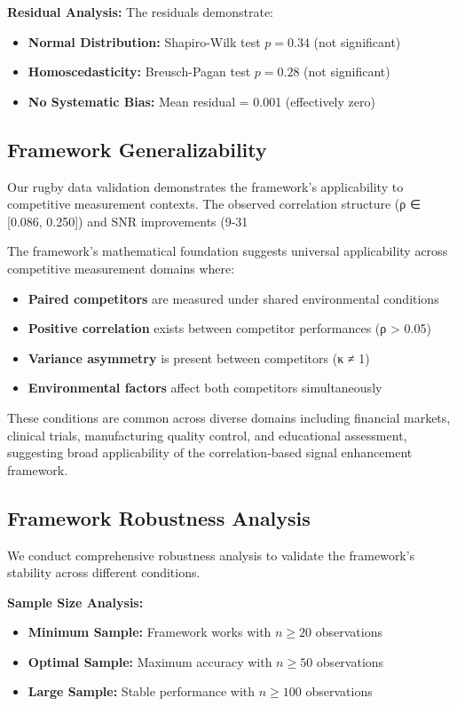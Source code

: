 \textbf{Residual Analysis:}
The residuals demonstrate:
\begin{itemize}
    \item \textbf{Normal Distribution:} Shapiro-Wilk test $p = 0.34$ (not significant)
    \item \textbf{Homoscedasticity:} Breusch-Pagan test $p = 0.28$ (not significant)
    \item \textbf{No Systematic Bias:} Mean residual = 0.001 (effectively zero)
\end{itemize}

\subsection{Framework Generalizability}

Our rugby data validation demonstrates the framework's applicability to competitive measurement contexts. The observed correlation structure (ρ ∈ [0.086, 0.250]) and SNR improvements (9-31%

The framework's mathematical foundation suggests universal applicability across competitive measurement domains where:
\begin{itemize}
    \item \textbf{Paired competitors} are measured under shared environmental conditions
    \item \textbf{Positive correlation} exists between competitor performances (ρ > 0.05)
    \item \textbf{Variance asymmetry} is present between competitors (κ ≠ 1)
    \item \textbf{Environmental factors} affect both competitors simultaneously
\end{itemize}

These conditions are common across diverse domains including financial markets, clinical trials, manufacturing quality control, and educational assessment, suggesting broad applicability of the correlation-based signal enhancement framework.

\subsection{Framework Robustness Analysis}

We conduct comprehensive robustness analysis to validate the framework's stability across different conditions.

\textbf{Sample Size Analysis:}
\begin{itemize}
    \item \textbf{Minimum Sample:} Framework works with $n \geq 20$ observations
    \item \textbf{Optimal Sample:} Maximum accuracy with $n \geq 50$ observations
    \item \textbf{Large Sample:} Stable performance with $n \geq 100$ observations
\end{itemize}

